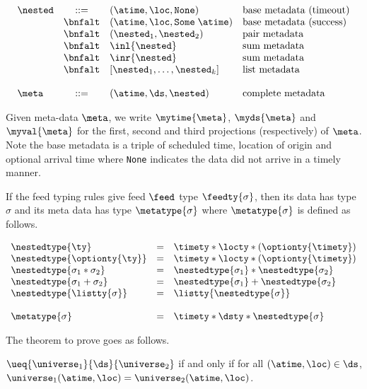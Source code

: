 \[
\begin{array}{lcll} 
\nested & ::=     
          & (\atime,\loc,\mathtt{None}) & \mbox{base metadata (timeout)} \\
& \bnfalt & (\atime,\loc,\mathtt{Some}\; \atime) & \mbox{base metadata (success)} \\
& \bnfalt & (\nested_1,\nested_2) & \mbox{pair metadata} \\
& \bnfalt & \inl{\nested} & \mbox{sum metadata} \\
& \bnfalt & \inr{\nested} & \mbox{sum metadata} \\
& \bnfalt & [\nested_1,\ldots,\nested_k] & \mbox{list metadata} \\
\\
\meta & ::= & (\atime,\ds,\nested) & \mbox{complete metadata} \\  
\end{array}
\] 

Given meta-data $\meta$, we write $\mytime{\meta}$, $\myds{\meta}$ and
$\myval{\meta}$ for the first, second and third projections (respectively) of $\meta$.
Note the base metadata is a triple of scheduled time, location of origin 
and optional arrival time where {\tt None} indicates the data did not arrive
in a timely manner.

If the feed typing rules give feed $\feed$ type $\feedty{\sigma}$, 
then its data has type $\sigma$ and
its meta data has type $\metatype{\sigma}$ where $\metatype{\sigma}$ is
defined as follows.

\[
\begin {array} {lcl}
\nestedtype{\ty} & = & \timety * \locty * (\optionty{\timety}) \\
\nestedtype{\optionty{\ty}} & = & \timety * \locty * (\optionty{\timety}) \\
\nestedtype{\sigma_1 * \sigma_2} & = & \nestedtype{\sigma_1} * \nestedtype{\sigma_2} \\
\nestedtype{\sigma_1 + \sigma_2} & = & \nestedtype{\sigma_1} + \nestedtype{\sigma_2} \\
\nestedtype{\listty{\sigma}} & = & \listty{\nestedtype{\sigma}} \\
\\
\metatype{\sigma} & = & \timety * \dsty * \nestedtype{\sigma} \\
\end{array}
\]


The theorem to prove goes as follows.

\begin{definition}
$\ueq{\universe_1}{\ds}{\universe_2}$ if and only if for all
$(\atime,\loc) \in \ds$, $\universe_1(\atime,\loc) = \universe_2(\atime,\loc)$.
\end{definition}

